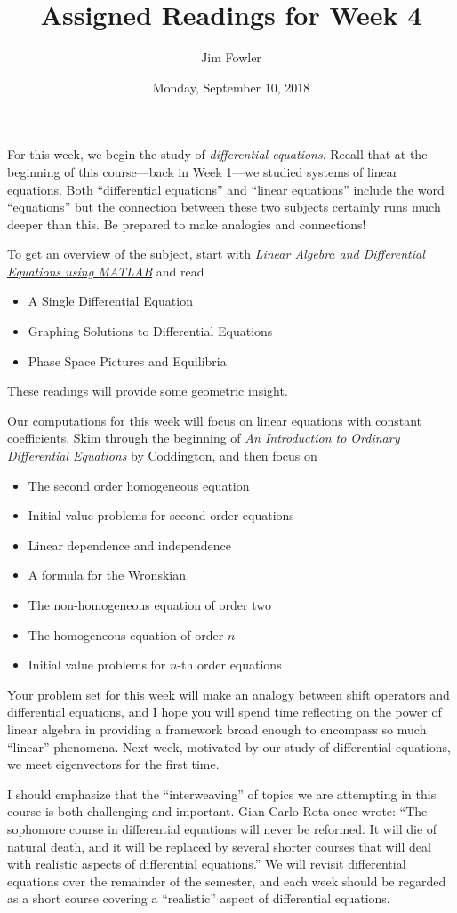 \documentclass{homework}
\author{Jim Fowler}
\title{Assigned Readings for Week 4}
\date{Monday, September 10, 2018}
\begin{document}
\maketitle

For this week, we begin the study of \textit{differential equations}.
Recall that at the beginning of this course---back in Week 1---we
studied systems of linear equations.  Both ``differential equations''
and ``linear equations'' include the word ``equations'' but the
connection between these two subjects certainly runs much deeper than
this.  Be prepared to make analogies and connections!

To get an overview of the subject, start with
\textit{\href{/courses/43735/files/folder/textbooks}{Linear Algebra and
  Differential Equations using MATLAB}} and read
\begin{itemize}
\item {} A Single Differential Equation
\item {} Graphing Solutions to Differential Equations
\item {} Phase Space Pictures and Equilibria
\end{itemize}
These readings will provide some geometric insight.

Our computations for this week will focus on linear equations with
constant coefficients.  Skim through the beginning of \textit{An
  Introduction to Ordinary Differential Equations} by Coddington, and
then focus on
\begin{itemize}
\item {} The second order homogeneous equation
\item {} Initial value problems for second order equations
\item {} Linear dependence and independence
\item {} A formula for the Wronskian
\item {} The non-homogeneous equation of order two
\item {} The homogeneous equation of order $n$
\item {} Initial value problems for $n$-th order equations
\end{itemize}

Your problem set for this week will make an analogy between shift
operators and differential equations, and I hope you will spend time
reflecting on the power of linear algebra in providing a framework
broad enough to encompass so much ``linear'' phenomena.  Next week,
motivated by our study of differential equations, we meet eigenvectors
for the first time.

I should emphasize that the ``interweaving'' of topics we are
attempting in this course is both challenging and
important. Gian-Carlo Rota once wrote: ``The sophomore course in
differential equations will never be reformed.  It will die of natural
death, and it will be replaced by several shorter courses that will
deal with realistic aspects of differential equations.''  We will revisit differential equations over the remainder of the semester, and each week should be regarded as a short course covering a ``realistic'' aspect of differential equations.
\end{document}
